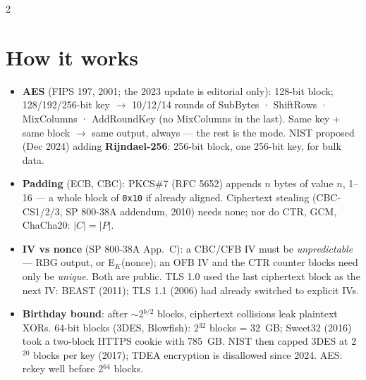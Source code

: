 \documentclass[8pt]{extarticle}
\newcommand\ct[1]{\texttt{#1}}
\begin{document}
\begin{multicols}{2}
\raggedright
\footnotesize{}

\section{How it works}
\begin{itemize}
  \item \textbf{AES} (FIPS 197, 2001; the 2023 update is editorial only): 128-bit block; 128/192/256-bit
        key $\to$ 10/12/14 rounds of SubBytes · ShiftRows · MixColumns · AddRoundKey (no MixColumns
        in the last). Same key + same block $\to$ same output, always — the rest is the mode. NIST
        proposed (Dec 2024) adding \textbf{Rijndael-256}: 256-bit block, one 256-bit key, for bulk data.
  \item \textbf{Padding} (ECB, CBC): PKCS\#7 (RFC 5652) appends $n$ bytes of value $n$, 1–16 — a whole
        block of \ct{0x10} if already aligned. Ciphertext stealing (CBC-CS1/2/3, SP 800-38A addendum,
        2010) needs none; nor do CTR, GCM, ChaCha20: $|C| = |P|$.
  \item \textbf{IV vs nonce} (SP 800-38A App.~C): a CBC/CFB IV must be \emph{unpredictable} — RBG
        output, or E$_K$(nonce); an OFB IV and the CTR counter blocks need only be \emph{unique}.
        Both are public. TLS 1.0 used the last ciphertext block as the next IV: BEAST (2011);
        TLS 1.1 (2006) had already switched to explicit IVs.
  \item \textbf{Birthday bound}: after $\sim$2$^{b/2}$ blocks, ciphertext collisions leak plaintext
        XORs. 64-bit blocks (3DES, Blowfish): 2$^{32}$ blocks = 32~GB; Sweet32 (2016) took a two-block
        HTTPS cookie with 785~GB. NIST then capped 3DES at 2$^{20}$ blocks per key (2017); TDEA encryption
        is disallowed since 2024. AES: rekey well before 2$^{64}$ blocks.
\end{itemize}


\end{multicols}
\end{document}
